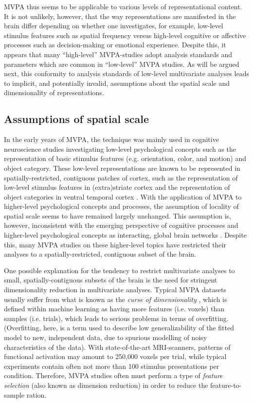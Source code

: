 \documentclass[jou,12pt,a4paper]{apa6}
\begin{document}
MVPA thus seems to be applicable to various levels of representational content. It is not unlikely, however, that the way representations are manifested in the brain differ depending on whether one investigates, for example, low-level stimulus features such as spatial frequency versus high-level cognitive or affective processes such as decision-making or emotional experience. Despite this, it appears that many ``high-level'' MVPA-studies adopt analysis standards and parameters which are common in ``low-level'' MVPA studies. As will be argued next, this conformity to analysis standards of low-level multivariate analyses leads to implicit, and potentially invalid, assumptions about the spatial scale and dimensionality of representations.

\subsection{Assumptions of spatial scale}
In the early years of MVPA, the technique was mainly used in cognitive neuroscience studies investigating low-level psychological concepts such as the representation of basic stimulus features (e.g. orientation, color, and motion) and object category. These low-level representations are known to be represented in spatially-restricted, contiguous patches of cortex, such as the representation of low-level stimulus features in (extra)striate cortex \cite{kamitani2005,parkes2009} and the representation of object categories in ventral temporal cortex \cite{haxby2001,eger2008}. With the application of MVPA to higher-level psychological concepts and processes, the assumption of locality of spatial scale seems to have remained largely unchanged. This assumption is, however, inconsistent with the emerging perspective of cognitive processes and higher-level psychological concepts as interacting, global brain networks \cite{bressler2010,barrett2013}. Despite this, many MVPA studies on these higher-level topics have restricted their analyses to a spatially-restricted, contiguous subset of the brain. 

One possible explanation for the tendency to restrict multivariate analyses to small, spatially-contiguous subsets of the brain is the need for stringent dimensionality reduction in multivariate analyses. Typical MVPA datasets usually suffer from what is known as the \emph{curse of dimensionality} \cite{haynes2015}, which is defined within machine learning as having more features (i.e. voxels) than samples (i.e. trials), which leads to serious problems in terms of overfitting. (Overfitting, here, is a term used to describe low generalizability of the fitted model to new, independent data, due to spurious modelling of noisy characteristics of the data). With state-of-the-art MRI-scanners, patterns of functional activation may amount to 250,000 voxels per trial, while typical experiments contain often not more than 100 stimulus presentations per condition. Therefore, MVPA studies often must perform a type of \emph{feature selection} (also known as dimension reduction) in order to reduce the feature-to-sample ration. 
\end{document}
